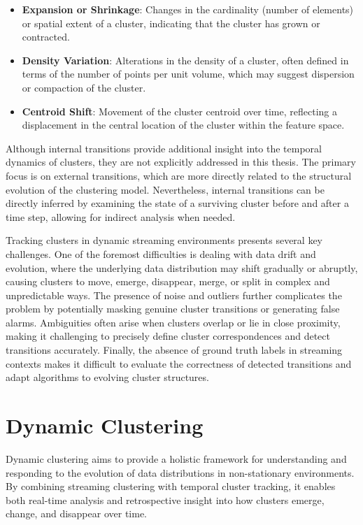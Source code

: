 \begin{itemize}
    \item \textbf{Expansion or Shrinkage}: Changes in the cardinality (number of
          elements) or spatial extent of a cluster, indicating that the cluster has
          grown or contracted.
    \item \textbf{Density Variation}: Alterations in the density of a cluster,
          often defined in terms of the number of points per unit volume, which may
          suggest dispersion or compaction of the cluster.
    \item \textbf{Centroid Shift}: Movement of the cluster centroid over time,
          reflecting a displacement in the central location of the cluster within the
          feature space.
\end{itemize}

Although internal transitions provide additional insight into the temporal
dynamics of clusters, they are not explicitly addressed in this thesis. The
primary focus is on external transitions, which are more directly related to
the structural evolution of the clustering model. Nevertheless, internal
transitions can be directly inferred by examining the state of a surviving
cluster before and after a time step, allowing for indirect analysis when
needed.

Tracking clusters in dynamic streaming environments presents several key
challenges. One of the foremost difficulties is dealing with data drift and
evolution, where the underlying data distribution may shift gradually or
abruptly, causing clusters to move, emerge, disappear, merge, or split in
complex and unpredictable ways. The presence of noise and outliers further
complicates the problem by potentially masking genuine cluster transitions or
generating false alarms. Ambiguities often arise when clusters overlap or lie
in close proximity, making it challenging to precisely define cluster
correspondences and detect transitions accurately. Finally, the absence of
ground truth labels in streaming contexts makes it difficult to evaluate the
correctness of detected transitions and adapt algorithms to evolving cluster
structures.

\section{Dynamic Clustering}\label{sec:dynamic_clustering}

Dynamic clustering aims to provide a holistic framework for understanding and
responding to the evolution of data distributions in non-stationary
environments. By combining streaming clustering with temporal cluster tracking,
it enables both real-time analysis and retrospective insight into how clusters
emerge, change, and disappear over time.

